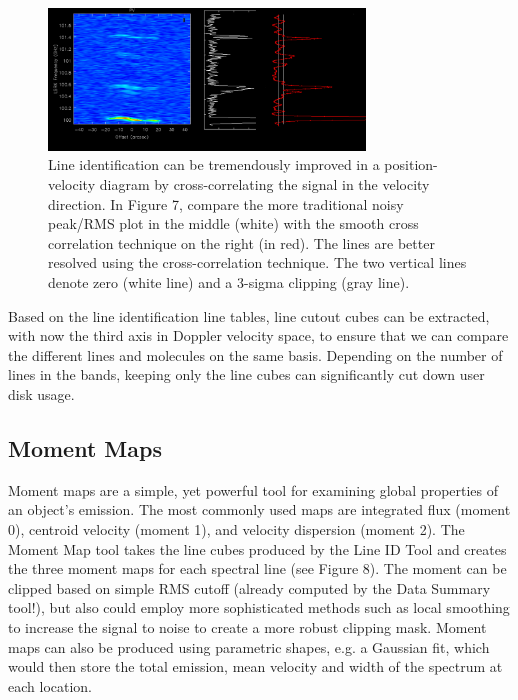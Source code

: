 \begin{figure}[t]
\centering
\includegraphics[width=0.75\textwidth]{line-id.png}
\hspace{0.03in}
\caption{\small \setlength{\baselineskip}{0.85\baselineskip}
Line identification can be tremendously improved in a position-velocity diagram
by cross-correlating the signal in the velocity direction. In Figure 7, compare the more
traditional noisy peak/RMS plot in the middle (white) with the smooth
cross correlation technique on the right (in red). The lines are better
resolved using the cross-correlation technique. The two vertical lines
denote zero (white line) and a 3-sigma clipping (gray line).
  }
  \label{fig:hst}
  \end{figure}


Based on the line identification line tables, line cutout cubes can be 
extracted, with now the third axis in Doppler velocity space, to ensure that 
we can compare the different lines and molecules on the same basis. Depending 
on the number of lines in the bands, keeping only the line cubes can significantly 
cut down user disk usage.

\subsection{Moment Maps}

Moment maps are a simple, yet powerful tool for examining global properties 
of an object’s emission. The most commonly used maps are integrated flux 
(moment 0), centroid velocity (moment 1), and velocity dispersion (moment 2).  
The Moment Map tool takes the line cubes produced by the Line ID Tool and 
creates the three moment maps for each spectral line (see Figure 8). The moment 
can be clipped based on simple RMS cutoff (already computed by the Data 
Summary tool!), but also could employ more sophisticated methods such as local 
smoothing to increase the signal to noise to create a more robust clipping mask. 
Moment maps can also be produced using parametric shapes, e.g. a Gaussian fit, 
which would then store the total emission, mean velocity and width of the 
spectrum at each location.

